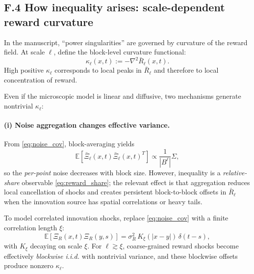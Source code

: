\documentclass[12pt,a4paper]{article}
\theoremstyle{definition}
\begin{document}
\subsection*{F.4 How inequality arises: scale-dependent reward curvature}

In the manuscript, ``power singularities'' are governed by curvature of the reward field.
At scale $\ell$, define the block-level curvature functional:
\begin{equation}
  \kappa_\ell(x,t) := -\nabla^2 \bar{R}_\ell(x,t).
  \label{eq:curvature_scale}
\end{equation}
High positive $\kappa_\ell$ corresponds to local peaks in $\bar{R}_\ell$ and therefore to local concentration
of reward.

Even if the microscopic model is linear and diffusive, two mechanisms generate nontrivial $\kappa_\ell$:

\paragraph{(i) Noise aggregation changes effective variance.}
From \eqref{eq:noise_cov}, block-averaging yields
\begin{equation}
  \mathbb{E}[\bar{\Xi}_\ell(x,t)\bar{\Xi}_\ell(x,t)^T]
  \propto
  \frac{1}{|B^\ell|}\Sigma,
  \label{eq:noise_scaling}
\end{equation}
so the \emph{per-point} noise decreases with block size.  However, inequality is a \emph{relative-share}
observable \eqref{eq:reward_share}; the relevant effect is that aggregation reduces local cancellation
of shocks and creates persistent block-to-block offsets in $\bar{R}_\ell$ when the innovation source has
spatial correlations or heavy tails.

To model correlated innovation shocks, replace \eqref{eq:noise_cov} with a finite correlation length $\xi$:
\begin{equation}
  \mathbb{E}[\Xi_R(x,t)\Xi_R(y,s)]
  =
  \sigma_R^2\,K_\xi(|x-y|)\,\delta(t-s),
  \label{eq:correlated_noise}
\end{equation}
with $K_\xi$ decaying on scale $\xi$.  For $\ell \gtrsim \xi$, coarse-grained reward shocks become effectively
\emph{blockwise i.i.d.} with nontrivial variance, and these blockwise offsets produce nonzero $\kappa_\ell$.
\end{document}
